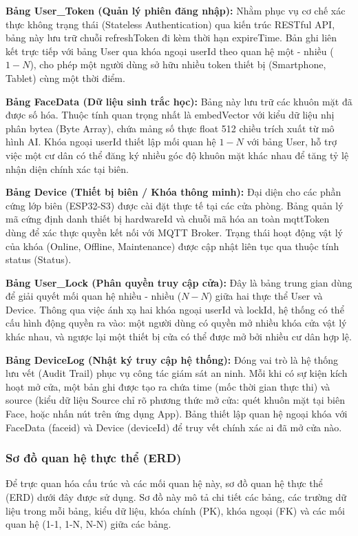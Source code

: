 \textbf{Bảng User\_Token (Quản lý phiên đăng nhập):} Nhằm phục vụ cơ chế xác thực không trạng thái (Stateless Authentication) qua kiến trúc RESTful API, bảng này lưu trữ chuỗi refreshToken đi kèm thời hạn expireTime. Bản ghi liên kết trực tiếp với bảng User qua khóa ngoại userId theo quan hệ một - nhiều ($1-N$), cho phép một người dùng sở hữu nhiều token thiết bị (Smartphone, Tablet) cùng một thời điểm.

\textbf{Bảng FaceData (Dữ liệu sinh trắc học):} Bảng này lưu trữ các khuôn mặt đã được số hóa. Thuộc tính quan trọng nhất là embedVector với kiểu dữ liệu nhị phân bytea (Byte Array), chứa mảng số thực float 512 chiều trích xuất từ mô hình AI. Khóa ngoại userId thiết lập mối quan hệ $1-N$ với bảng User, hỗ trợ việc một cư dân có thể đăng ký nhiều góc độ khuôn mặt khác nhau để tăng tỷ lệ nhận diện chính xác tại biên.

\textbf{Bảng Device (Thiết bị biên / Khóa thông minh):} Đại diện cho các phần cứng lớp biên (ESP32-S3) được cài đặt thực tế tại các cửa phòng. Bảng quản lý mã cứng định danh thiết bị hardwareId và chuỗi mã hóa an toàn mqttToken dùng để xác thực quyền kết nối với MQTT Broker. Trạng thái hoạt động vật lý của khóa (Online, Offline, Maintenance) được cập nhật liên tục qua thuộc tính status (Status).

\textbf{Bảng User\_Lock (Phân quyền truy cập cửa):} Đây là bảng trung gian dùng để giải quyết mối quan hệ nhiều - nhiều ($N-N$) giữa hai thực thể User và Device. Thông qua việc ánh xạ hai khóa ngoại userId và lockId, hệ thống có thể cấu hình động quyền ra vào: một người dùng có quyền mở nhiều khóa cửa vật lý khác nhau, và ngược lại một thiết bị cửa có thể được mở bởi nhiều cư dân hợp lệ.

\textbf{Bảng DeviceLog (Nhật ký truy cập hệ thống):} Đóng vai trò là hệ thống lưu vết (Audit Trail) phục vụ công tác giám sát an ninh. Mỗi khi có sự kiện kích hoạt mở cửa, một bản ghi được tạo ra chứa time (mốc thời gian thực thi) và source (kiểu dữ liệu Source chỉ rõ phương thức mở cửa: quét khuôn mặt tại biên Face, hoặc nhấn nút trên ứng dụng App). Bảng thiết lập quan hệ ngoại khóa với FaceData (faceid) và Device (deviceId) để truy vết chính xác ai đã mở cửa nào.

\subsubsection{Sơ đồ quan hệ thực thể (ERD)}
Để trực quan hóa cấu trúc và các mối quan hệ này, sơ đồ quan hệ thực thể (ERD) dưới đây được sử dụng. Sơ đồ này mô tả chi tiết các bảng, các trường dữ liệu trong mỗi bảng, kiểu dữ liệu, khóa chính (PK), khóa ngoại (FK) và các mối quan hệ (1-1, 1-N, N-N) giữa các bảng.

